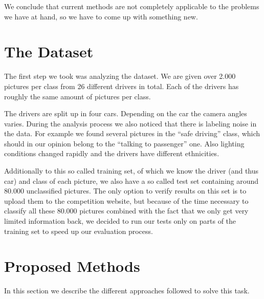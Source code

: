 \documentclass[10pt,twocolumn,letterpaper]{article}
\begin{document}
We conclude that current methods are not completely applicable to the problems we have at hand, so we have to come up with something new.




\section{The Dataset}
The first step we took was analyzing the dataset. We are given over 2.000 pictures per class from 26 different drivers in total. Each of the drivers has roughly the same amount of pictures per class. 

The drivers are split up in four cars. Depending on the car the camera angles varies. During the analysis process we also noticed that there is labeling noise in the data. For example we found several pictures in the ``safe driving'' class, which should in our opinion belong to the ``talking to passenger'' one. Also lighting conditions changed rapidly and the drivers have different ethnicities.


Additionally to this so called training set, of which we know the driver (and thus car) and class of each picture, we also have a so called test set containing around 80.000 unclassified pictures. The only option to verify results on this set is to upload them to the competition website, but because of the time necessary to classify all these 80.000 pictures combined with the fact that we only get very limited information back, we decided to run our tests only on parts of the training set to speed up our evaluation process.



\section{Proposed Methods}
In this section we describe the different approaches followed to solve this task.
\end{document}
